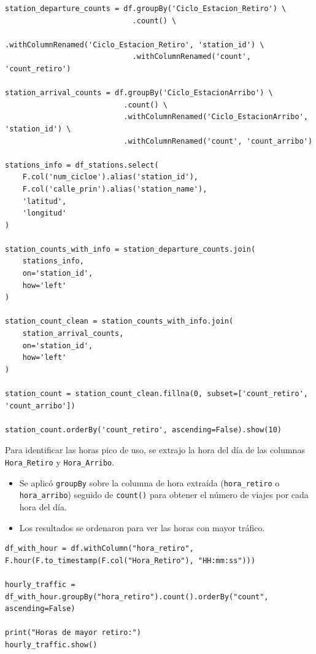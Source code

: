 \documentclass[12pt]{article}
\begin{document}
    \begin{lstlisting}[style=python, caption={Cálculo de viajes por estación y unión con información geográfica.}, label={lst:join_stations}]
station_departure_counts = df.groupBy('Ciclo_Estacion_Retiro') \
                             .count() \
                             .withColumnRenamed('Ciclo_Estacion_Retiro', 'station_id') \
                             .withColumnRenamed('count', 'count_retiro')

station_arrival_counts = df.groupBy('Ciclo_EstacionArribo') \
                           .count() \
                           .withColumnRenamed('Ciclo_EstacionArribo', 'station_id') \
                           .withColumnRenamed('count', 'count_arribo')

stations_info = df_stations.select(
    F.col('num_cicloe').alias('station_id'),
    F.col('calle_prin').alias('station_name'),
    'latitud',
    'longitud'
)

station_counts_with_info = station_departure_counts.join(
    stations_info,
    on='station_id',
    how='left'
)

station_count_clean = station_counts_with_info.join(
    station_arrival_counts,
    on='station_id',
    how='left'
)

station_count = station_count_clean.fillna(0, subset=['count_retiro', 'count_arribo'])

station_count.orderBy('count_retiro', ascending=False).show(10)
    \end{lstlisting}

    Para identificar las horas pico de uso, se extrajo la hora del día de las columnas \texttt{Hora\_Retiro} y \texttt{Hora\_Arribo}.
    \begin{itemize}
        \item Se aplicó \texttt{groupBy} sobre la columna de hora extraída (\texttt{hora\_retiro} o \texttt{hora\_arribo}) seguido de \texttt{count()} para obtener el número de viajes por cada hora del día.
        \item Los resultados se ordenaron para ver las horas con mayor tráfico.
    \end{itemize}

    \begin{lstlisting}[style=python, caption={Extracción y conteo de viajes por hora de retiro.}, label={lst:hourly_traffic}]
df_with_hour = df.withColumn("hora_retiro", F.hour(F.to_timestamp(F.col("Hora_Retiro"), "HH:mm:ss")))

hourly_traffic = df_with_hour.groupBy("hora_retiro").count().orderBy("count", ascending=False)

print("Horas de mayor retiro:")
hourly_traffic.show()
    \end{lstlisting}
\end{document}
